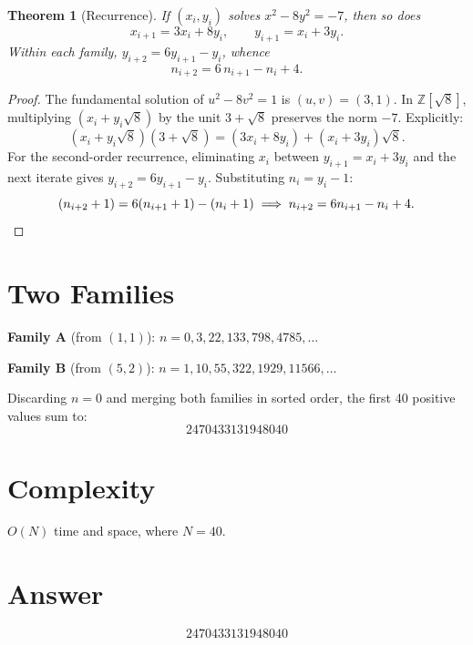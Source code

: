 \documentclass[12pt]{article}
\newtheorem{theorem}{Theorem}
\begin{document}
\begin{theorem}[Recurrence]\label{thm:rec}
If $(x_i,y_i)$ solves $x^2-8y^2=-7$, then so does
\[
x_{i+1}=3x_i+8y_i,\qquad y_{i+1}=x_i+3y_i.
\]
Within each family, $y_{i+2}=6y_{i+1}-y_i$, whence
\[
n_{i+2}=6\,n_{i+1}-n_i+4.
\]
\end{theorem}

\begin{proof}
The fundamental solution of $u^2-8v^2=1$ is $(u,v)=(3,1)$.  In $\mathbb{Z}[\sqrt{8}]$, multiplying $(x_i+y_i\sqrt{8})$ by the unit $3+\sqrt{8}$ preserves the norm $-7$.  Explicitly:
\[
(x_i+y_i\sqrt{8})(3+\sqrt{8})=(3x_i+8y_i)+(x_i+3y_i)\sqrt{8}.
\]
For the second-order recurrence, eliminating $x_i$ between $y_{i+1}=x_i+3y_i$ and the next iterate gives $y_{i+2}=6y_{i+1}-y_i$.  Substituting $n_i=y_i-1$:
\[
(n_{i+2}+1)=6(n_{i+1}+1)-(n_i+1) \implies n_{i+2}=6n_{i+1}-n_i+4. \qedhere
\]
\end{proof}

\section{Two Families}

\textbf{Family A} (from $(1,1)$): $n=0,3,22,133,798,4785,\ldots$

\textbf{Family B} (from $(5,2)$): $n=1,10,55,322,1929,11566,\ldots$

Discarding $n=0$ and merging both families in sorted order, the first 40 positive values sum to:
\[
\boxed{2470433131948040}
\]

\section{Complexity}
$O(N)$ time and space, where $N=40$.

\section{Answer}

\[
\boxed{2470433131948040}
\]
\end{document}
